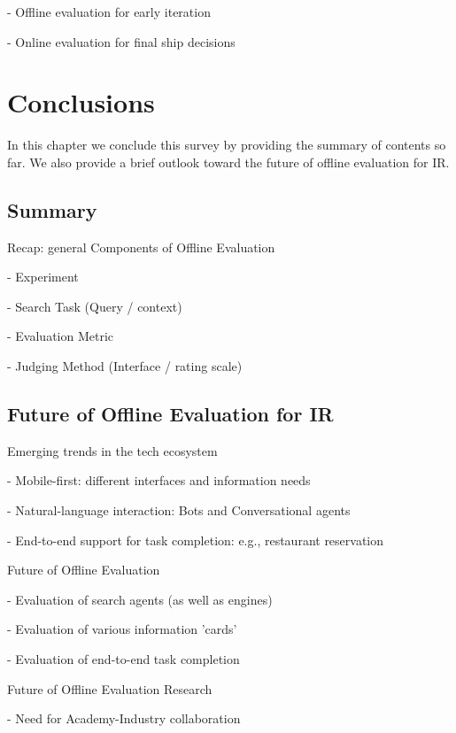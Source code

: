 \documentclass[openany]{now} %
\newcommand{\newpar}{\bigskip\noindent}
\begin{document}
- Offline evaluation for early iteration

- Online evaluation for final ship decisions

\chapter{Conclusions}

In this chapter we conclude this survey by providing the summary of contents so far. 
We also provide a brief outlook toward the future of offline evaluation for IR.

\section{Summary}

Recap: general Components of Offline Evaluation

-	Experiment

-	Search Task (Query / context)

-	Evaluation Metric

-	Judging Method (Interface / rating scale) 


\section{Future of Offline Evaluation for IR}

Emerging trends in the tech ecosystem

- Mobile-first: different interfaces and information needs

- Natural-language interaction: Bots and Conversational agents

- End-to-end support for task completion: e.g., restaurant reservation 

\newpar
Future of Offline Evaluation

- Evaluation of search agents (as well as engines)

- Evaluation of various information 'cards'

- Evaluation of end-to-end task completion

\newpar
Future of Offline Evaluation Research

- Need for Academy-Industry collaboration

\backmatter  %



	
\end{document}
